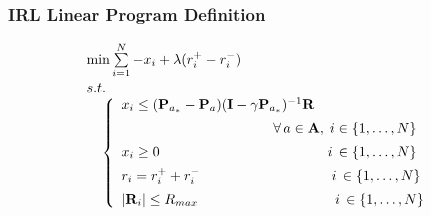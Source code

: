 \begin{frame}
	\frametitle{IRL Linear Program Definition}
	
	\Large
	
	\vspace{-0.3cm}
	
	\begin{equation*}
		\begin{array}{ll}
			\min \sum\limits_{i=1}^N -x_i + \lambda (r_i^+ - r_i^-)
			\vspace{-0.35cm} \\ \\
			s.t. \\ \;\;\;\;
			\left \{
				\begin{array}{ll}
					x_i \leq (\mathbf{P}_{a_*} - \mathbf{P}_a)(\mathbf{I} - \gamma
					\mathbf{P}_{a_*})^{-1} \mathbf{R} \\
					\vspace{-0.25cm} \\
					\;\;\;\;\;\;\;\;\;\,\,\;\;\;\;\;\;\;\;\;\;\;\;\;\;\;\;\;\;\;\;\;\;\;\;\;\;
					\;\;\; \forall \, a \in \mathbf{A}, \; i \in \{ 1, \ldots, N \}
					\vspace{-0.25cm}\\ \\
					x_i \geq 0 \;\;\;\;\;\;\,\,\,\,\;\;\;\,\,\,\,\,\;\,\,\,\,\,\,\,\;\;\;\;\;
					\;\;\;\;\;\;\;\;\;\;\;\;\;\,\,\;\,\,\,\,\,\, i \, \in \{ 1, \ldots, N \}
					\vspace{-0.25cm} \\ \\
					r_i = r_i^+ + r_i^- \;\,\,\,\,\,\;\,\,\,\,\,\,\,\;\;\;\;\;
					\;\;\;\;\;\;\;\;\;\;\;\;\,\,\,\,\,\,\,\,\,\,\,\,\, i \, \in \{ 1, \ldots, N \}
					\vspace{-0.25cm}
					\\ \\
					| \mathbf{R}_i | \leq R_{max} \;\;\;\;\;\;\;\;\;\;\;\,\,\,\,\;\;\
					\;\;\;\;\;\;\;\;\;\;\;\,\,\;\;\;\,\,\,\,\,\, i \, \in \{ 1, \ldots, N \}
				\end{array}
			\right.
			\vspace{0.2cm}
		\end{array}
	\end{equation*}
\end{frame}

